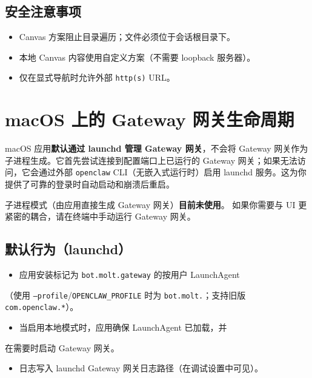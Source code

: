 \subsection{安全注意事项}


\begin{itemize}
  \item Canvas 方案阻止目录遍历；文件必须位于会话根目录下。
  \item 本地 Canvas 内容使用自定义方案（不需要 loopback 服务器）。
  \item 仅在显式导航时允许外部 \texttt{http(s)} URL。
\end{itemize}



\clearpage

\section{macOS 上的 Gateway 网关生命周期}


macOS 应用\textbf{默认通过 launchd 管理 Gateway 网关}，不会将
Gateway 网关作为子进程生成。它首先尝试连接到配置端口上已运行的
Gateway 网关；如果无法访问，它会通过外部 \texttt{openclaw} CLI（无嵌入式运行时）启用 launchd
服务。这为你提供了可靠的登录时自动启动和崩溃后重启。

子进程模式（由应用直接生成 Gateway 网关）\textbf{目前未使用}。
如果你需要与 UI 更紧密的耦合，请在终端中手动运行 Gateway 网关。

\subsection{默认行为（launchd）}


\begin{itemize}
  \item 应用安装标记为 \texttt{bot.molt.gateway} 的按用户 LaunchAgent
\end{itemize}

（使用 \texttt{--profile}/\texttt{OPENCLAW\_PROFILE} 时为 \texttt{bot.molt.}；支持旧版 \texttt{com.openclaw.*}）。
\begin{itemize}
  \item 当启用本地模式时，应用确保 LaunchAgent 已加载，并
\end{itemize}

在需要时启动 Gateway 网关。
\begin{itemize}
  \item 日志写入 launchd Gateway 网关日志路径（在调试设置中可见）。
\end{itemize}


